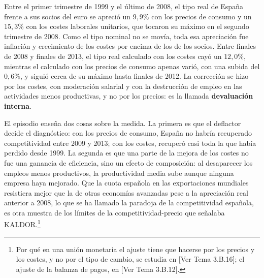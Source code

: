 \documentclass[10pt,a4paper]{article}
\newcommand{\authorfont}[1]{{\fontfamily{EBGaramond-TLF}\selectfont #1}}
\begin{document}
Entre el primer trimestre de 1999 y el último de 2008, el tipo real de España frente a sus socios del euro se apreció un $9{,}9\%$ con los precios de consumo y un $15{,}3\%$ con los costes laborales unitarios, que tocaron su máximo en el segundo trimestre de 2008. Como el tipo nominal no se movía, toda esa apreciación fue inflación y crecimiento de los costes por encima de los de los socios. Entre finales de 2008 y finales de 2013, el tipo real calculado con los costes cayó un $12{,}0\%$, mientras el calculado con los precios de consumo apenas varió, con una subida del $0{,}6\%$, y siguió cerca de su máximo hasta finales de 2012. La corrección se hizo por los costes, con moderación salarial y con la destrucción de empleo en las actividades menos productivas, y no por los precios: es la llamada \textbf{devaluación interna}.

El episodio enseña dos cosas sobre la medida. La primera es que el deflactor decide el diagnóstico: con los precios de consumo, España no habría recuperado competitividad entre 2009 y 2013; con los costes, recuperó casi toda la que había perdido desde 1999. La segunda es que una parte de la mejora de los costes no fue una ganancia de eficiencia, sino un efecto de composición: al desaparecer los empleos menos productivos, la productividad media sube aunque ninguna empresa haya mejorado. Que la cuota española en las exportaciones mundiales resistiera mejor que la de otras economías avanzadas pese a la apreciación real anterior a 2008, lo que se ha llamado la paradoja de la competitividad española, es otra muestra de los límites de la competitividad-precio que señalaba KALDOR.\footnote{%
    Por qué en una unión monetaria el ajuste tiene que hacerse por los precios y los costes, y no por el tipo de cambio, se estudia en [\authorfont{Ver Tema 3.B.16}]; el ajuste de la balanza de pagos, en [\authorfont{Ver Tema 3.B.12}].
}
\end{document}
